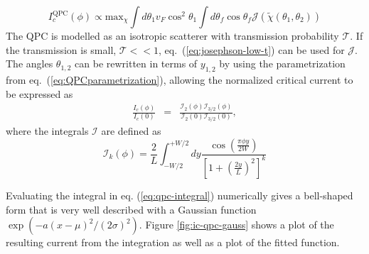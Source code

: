 \begin{equation}
I_c^{\text{QPC}}(\phi) \propto \text{max}_{\chi} \int d \theta_1 v_F \cos^2 \theta_1 \int d \theta_f \cos \theta_f \mathcal{J}\left( \tilde{\chi} (\theta_1, \theta_2) \right)
\end{equation}
The QPC is modelled as an isotropic scatterer with transmission probability $\mathcal{T}$. If the transmission is small, $\mathcal{T} << 1$, eq.~(\ref{eq:josephson-low-t}) can be used for $\mathcal{J}$.
The angles $\theta_{1, 2}$ can be rewritten in terms of $y_{1, 2}$ by using the parametrization from eq.~(\ref{eq:QPCparametrization}), allowing the normalized critical current to be expressed as
\begin{eqnarray}
\frac{I_c(\phi)}{I_c(0)} &=& \frac{\mathcal{I}_2(\phi)\mathcal{I}_{3/2}(\phi)}{\mathcal{I}_2(0)\mathcal{I}_{3/2}(0)}\label{eq:qpc-integral},
\end{eqnarray}
where the integrals $\mathcal{I}$ are defined as
\begin{equation}
\mathcal{I}_k(\phi) = \frac{2}{L}\int_{-W/2}^{+W/2}dy \frac{\cos\left(\frac{\pi\phi y}{2W}\right)}{\left[1 + \left(\frac{2y}{L}\right)^2 \right]^k}
\label{integral-qpc}
\end{equation}

Evaluating the integral in eq. (\ref{eq:qpc-integral}) numerically gives a bell-shaped form that is very well described with a Gaussian function $\exp ( -a (x-\mu)^2 / (2 \sigma)^2 )$. Figure \ref{fig:ic-qpc-gauss} shows a plot of the resulting current from the integration as well as a plot of the fitted function. 

